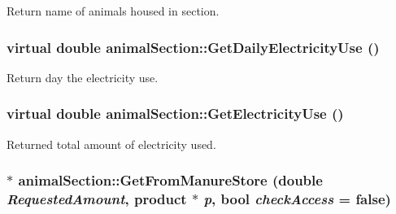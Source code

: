 Return name of animals housed in section. \hypertarget{classanimal_section_ac5e69d491872dc3b57cba2b59ba36cc2}{
\subsubsection[{GetDailyElectricityUse}]{\setlength{\rightskip}{0pt plus 5cm}virtual double animalSection::GetDailyElectricityUse ()}}
\label{classanimal_section_ac5e69d491872dc3b57cba2b59ba36cc2}


Return day the electricity use. \hypertarget{classanimal_section_a785811ba65d4822e7c3b284ce77cb67f}{
\subsubsection[{GetElectricityUse}]{\setlength{\rightskip}{0pt plus 5cm}virtual double animalSection::GetElectricityUse ()}}
\label{classanimal_section_a785811ba65d4822e7c3b284ce77cb67f}


Returned total amount of electricity used. \hypertarget{classanimal_section_a6fe2d73802cbac7f72ba723de24f5db4}{
\subsubsection[{GetFromManureStore}]{ $\ast$ animalSection::GetFromManureStore (double {\em RequestedAmount}, \/  {\bf product} $\ast$ {\em p}, \/  bool {\em checkAccess} = {\ttfamily false})}}
\label{classanimal_section_a6fe2d73802cbac7f72ba723de24f5db4}


